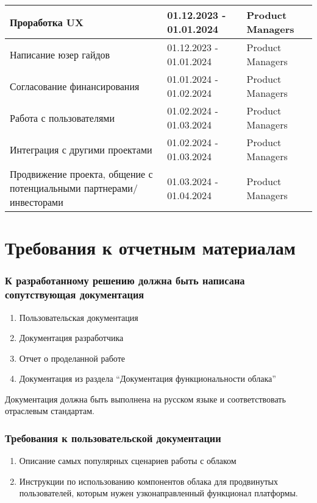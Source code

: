 \documentclass[14pt, a4paper]{extarticle}
\begin{document}
\begin{center}
\begin{longtable}{|D{0.4\textwidth}|D{0.2\textwidth}|D{0.3\textwidth}|}
\hline
Проработка UX & 01.12.2023 - 01.01.2024 & Product Managers \\
\hline
Написание юзер гайдов & 01.12.2023 - 01.01.2024 & Product Managers \\
\hline
Согласование финансирования & 01.01.2024 - 01.02.2024 & Product Managers \\
\hline
Работа с пользователями & 01.02.2024 - 01.03.2024 & Product Managers \\
\hline
Интеграция с другими проектами & 01.02.2024 - 01.03.2024 & Product Managers \\
\hline
Продвижение проекта, общение с потенциальными партнерами/инвесторами & 01.03.2024 - 01.04.2024 & Product Managers \\
\hline
\end{longtable}
\end{center}

\pagebreak

\section{Требования к отчетным материалам}

\subsubsection*{К разработанному решению должна быть написана сопутствующая документация}

\begin{enumerate}
\item Пользовательская документация
\item Документация разработчика
\item Отчет о проделанной работе
\item Документация из раздела “Документация функциональности облака”
\end{enumerate}

Документация должна быть выполнена на русском языке и соответствовать отраслевым стандартам.

\subsubsection*{Требования к пользовательской документации}

\begin{enumerate}
\item Описание самых популярных сценариев работы с облаком
\item Инструкции по использованию компонентов облака для продвинутых пользователей, которым нужен узконаправленный функционал платформы.
\end{enumerate}
\end{document}
